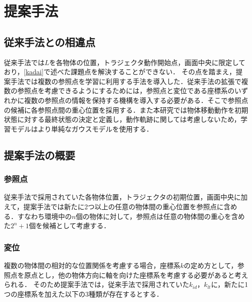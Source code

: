 ﻿%



\chapter{提案手法}

\section{従来手法との相違点}

従来手法では$L$を各物体の位置，トラジェクタ動作開始点，画面中央に限定しており，\ref{kadai}で述べた課題点を解決することができない．
その点を踏まえ，提案手法では複数の参照点を学習に利用する手法を導入した．従来手法の拡張で複数の参照点を考慮できるようにするためには，参照点と変位である座標系のいずれかに複数の参照点の情報を保持する機構を導入する必要がある．そこで参照点の候補に各参照点間の重心位置を採用する．また本研究では物体移動動作を初期状態に対する最終状態の決定と定義し，動作軌跡に関しては考慮しないため，学習モデルはより単純なガウスモデルを使用する．

\section{提案手法の概要}

\subsection{参照点}

従来手法で採用されていた各物体位置，トラジェクタの初期位置，画面中央に加えて，提案手法では新たに2つ以上の任意の物体間の重心位置を参照点に含める．すなわち環境中の$n$個の物体に対して，参照点は任意の物体間の重心を含めた$2^{n}+1$個を候補として考慮する．

\subsection{変位}

複数の物体間の相対的な位置関係を考慮する場合，座標系$k$の定め方として，参照点を原点とし，他の物体方向に軸を向けた座標系を考慮する必要があると考えられる．
そのため提案手法では，従来手法で採用されていた$k_{id}$，$k_{lt}$に，新たに1つの座標系を加えた以下の3種類が存在するとする．

